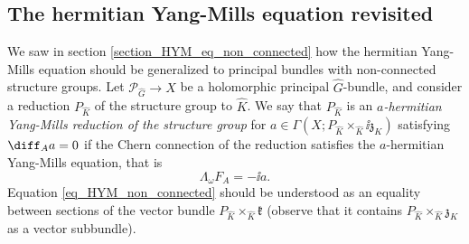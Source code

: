 \subsection{The hermitian Yang-Mills equation revisited}
We saw in section \ref{section_HYM_eq_non_connected} how the hermitian Yang-Mills equation should be generalized to principal bundles with non-connected structure groups. Let \(\mathcal{P}_{\hat{G}}\to X \) be a holomorphic principal \(\hat{G}\)-bundle, and consider a reduction \(P_{\hat{K}}\) of the structure group to \(\hat{K}\). We say that \(P_{\hat{K}}\) is an \textit{\(a\)-hermitian Yang-Mills reduction of the structure group} for \(a \in \Gamma(X;P_{\hat{K}} \times_{\hat{K}}\ii\mathfrak{z}_K)\) satisfying \(\diff_A a=0\) if the Chern connection of the reduction satisfies the \(a\)-hermitian Yang-Mills equation, that is
\begin{equation} \label{eq_HYM_non_connected}
    \Lambda_\omega F_A=- \ii a.
\end{equation}
Equation \eqref{eq_HYM_non_connected} should be understood as an equality between sections of the vector bundle \(P_{\hat{K}}\times_{\hat{K}}\mathfrak{k}\) (observe that it contains \(P_{\hat{K}}\times_{\hat{K}}\mathfrak{z}_K\) as a vector subbundle).

